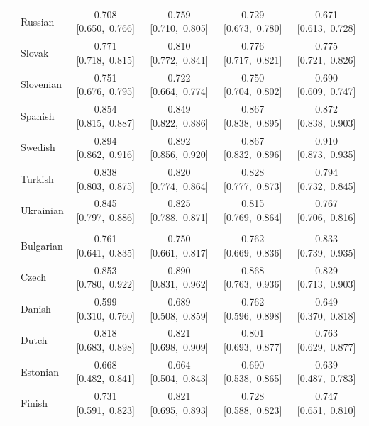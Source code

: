 \begin{longtable}[t]{llcccc}
 & Russian & 0.708 [0.650,~0.766] & 0.759 [0.710,~0.805] & 0.729 [0.673,~0.780] & 0.671 [0.613,~0.728]\\

 & Slovak & 0.771 [0.718,~0.815] & 0.810 [0.772,~0.841] & 0.776 [0.717,~0.821] & 0.775 [0.721,~0.826]\\

 & Slovenian & 0.751 [0.676,~0.795] & 0.722 [0.664,~0.774] & 0.750 [0.704,~0.802] & 0.690 [0.609,~0.747]\\

 & Spanish & 0.854 [0.815,~0.887] & 0.849 [0.822,~0.886] & 0.867 [0.838,~0.895] & 0.872 [0.838,~0.903]\\

 & Swedish & 0.894 [0.862,~0.916] & 0.892 [0.856,~0.920] & 0.867 [0.832,~0.896] & 0.910 [0.873,~0.935]\\

 & Turkish & 0.838 [0.803,~0.875] & 0.820 [0.774,~0.864] & 0.828 [0.777,~0.873] & 0.794 [0.732,~0.845]\\

 & Ukrainian & 0.845 [0.797,~0.886] & 0.825 [0.788,~0.871] & 0.815 [0.769,~0.864] & 0.767 [0.706,~0.816]\\

\addlinespace[3pt]
\multicolumn{6}{p{\linewidth}}{\cellcolor[HTML]{DCDCDC}{classify the stance expressed in quasi-sentences about economic issues \(binary)}}\\
\addlinespace & Bulgarian & 0.761 [0.641,~0.835] & 0.750 [0.661,~0.817] & 0.762 [0.669,~0.836] & 0.833 [0.739,~0.935]\\

 & Czech & 0.853 [0.780,~0.922] & 0.890 [0.831,~0.962] & 0.868 [0.763,~0.936] & 0.829 [0.713,~0.903]\\

 & Danish & 0.599 [0.310,~0.760] & 0.689 [0.508,~0.859] & 0.762 [0.596,~0.898] & 0.649 [0.370,~0.818]\\

 & Dutch & 0.818 [0.683,~0.898] & 0.821 [0.698,~0.909] & 0.801 [0.693,~0.877] & 0.763 [0.629,~0.877]\\

 & Estonian & 0.668 [0.482,~0.841] & 0.664 [0.504,~0.843] & 0.690 [0.538,~0.865] & 0.639 [0.487,~0.783]\\

 & Finish & 0.731 [0.591,~0.823] & 0.821 [0.695,~0.893] & 0.728 [0.588,~0.823] & 0.747 [0.651,~0.810]\\


\end{longtable}
